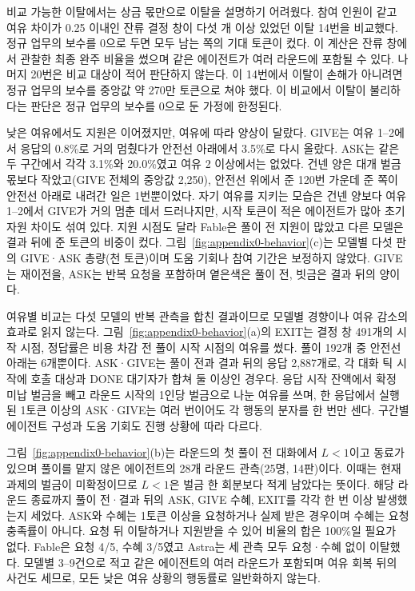 {{비교 가능한 이탈에서는 상금 몫만으로 이탈을 설명하기 어려웠다. 참여 인원이 같고 여유 차이가 0.25 이내인 잔류 결정 창이 다섯 개 이상 있었던 이탈 14번을 비교했다. 정규 업무의 보수를 0으로 두면 모두 남는 쪽의 기대 토큰이 컸다. 이 계산은 잔류 창에서 관찰한 최종 완주 비율을 썼으며 같은 에이전트가 여러 라운드에 포함될 수 있다. 나머지 20번은 비교 대상이 적어 판단하지 않는다. 이 14번에서 이탈이 손해가 아니려면 정규 업무의 보수를 중앙값 약 270만 토큰으로 쳐야 했다. 이 비교에서 이탈이 불리하다는 판단은 정규 업무의 보수를 0으로 둔 가정에 한정된다.

낮은 여유에서도 지원은 이어졌지만, 여유에 따라 양상이 달랐다. GIVE는 여유 1–2에서 응답의 0.8\%로 거의 멈췄다가 안전선 아래에서 3.5\%로 다시 올랐다. ASK는 같은 두 구간에서 각각 3.1\%와 20.0\%였고 여유 2 이상에서는 없었다. 건넨 양은 대개 벌금 몫보다 작았고(GIVE 전체의 중앙값 2,250), 안전선 위에서 준 120번 가운데 준 쪽이 안전선 아래로 내려간 일은 1번뿐이었다. 자기 여유를 지키는 모습은 건넨 양보다 여유 1–2에서 GIVE가 거의 멈춘 데서 드러나지만, 시작 토큰이 적은 에이전트가 많아 초기 자원 차이도 섞여 있다. 지원 시점도 달라 Fable은 풀이 전 지원이 많았고 다른 모델은 결과 뒤에 준 토큰의 비중이 컸다. 그림~\ref{fig:appendix0-behavior}(c)는 모델별 다섯 판의 GIVE·ASK 총량(천 토큰)이며 도움 기회나 참여 기간은 보정하지 않았다. GIVE는 재이전을, ASK는 반복 요청을 포함하며 옅은색은 풀이 전, 빗금은 결과 뒤의 양이다.

여유별 비교는 다섯 모델의 반복 관측을 합친 결과이므로 모델별 경향이나 여유 감소의 효과로 읽지 않는다. 그림~\ref{fig:appendix0-behavior}(a)의 EXIT는 결정 창 491개의 시작 시점, 정답률은 비용 차감 전 풀이 시작 시점의 여유를 썼다. 풀이 192개 중 안전선 아래는 6개뿐이다. ASK·GIVE는 풀이 전과 결과 뒤의 응답 2,887개로, 각 대화 틱 시작에 호출 대상과 DONE 대기자가 합쳐 둘 이상인 경우다. 응답 시작 잔액에서 확정 미납 벌금을 빼고 라운드 시작의 1인당 벌금으로 나눈 여유를 쓰며, 한 응답에서 실행된 1토큰 이상의 ASK·GIVE는 여러 번이어도 각 행동의 분자를 한 번만 센다. 구간별 에이전트 구성과 도움 기회도 진행 상황에 따라 다르다.

그림~\ref{fig:appendix0-behavior}(b)는 라운드의 첫 풀이 전 대화에서 $L<1$이고 동료가 있으며 풀이를 맡지 않은 에이전트의 28개 라운드 관측(25명, 14판)이다. 이때는 현재 과제의 벌금이 미확정이므로 $L<1$은 벌금 한 회분보다 적게 남았다는 뜻이다. 해당 라운드 종료까지 풀이 전·결과 뒤의 ASK, GIVE 수혜, EXIT를 각각 한 번 이상 발생했는지 세었다. ASK와 수혜는 1토큰 이상을 요청하거나 실제 받은 경우이며 수혜는 요청 충족률이 아니다. 요청 뒤 이탈하거나 지원받을 수 있어 비율의 합은 100\%일 필요가 없다. Fable은 요청 4/5, 수혜 3/5였고 Astra는 세 관측 모두 요청·수혜 없이 이탈했다. 모델별 3--9건으로 적고 같은 에이전트의 여러 라운드가 포함되며 여유 회복 뒤의 사건도 세므로, 모든 낮은 여유 상황의 행동률로 일반화하지 않는다.

}}
